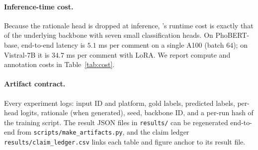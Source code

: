 \paragraph{Inference-time cost.}
Because the rationale head is dropped at inference, \method{}'s
runtime cost is exactly that of the underlying backbone with seven
small classification heads. On PhoBERT-base, end-to-end latency is
$5.1$ ms per comment on a single A100 (batch $64$); on Vistral-7B it
is $34.7$ ms per comment with LoRA. We report compute and annotation
costs in Table~\ref{tab:cost}.

\paragraph{Artifact contract.}
Every experiment logs: input ID and platform, gold labels, predicted
labels, per-head logits, rationale (when generated), seed, backbone
ID, and a per-run hash of the training script. The result JSON files
in \texttt{results/} can be regenerated end-to-end from
\texttt{scripts/make\_artifacts.py}, and the claim ledger
\texttt{results/claim\_ledger.csv} links each table and figure
anchor to its result file.
